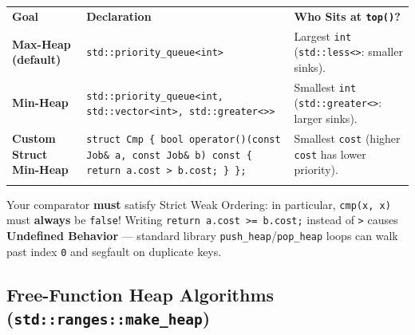 \documentclass[11pt,a4paper]{article}
\theoremstyle{definition}
\begin{document}
\begingroup\small{}
\begin{tabularx}{\textwidth}{>{\raggedright\arraybackslash\bfseries}p{3.9cm} >{\raggedright\arraybackslash}p{4.4cm} >{\raggedright\arraybackslash}X}
\arrayrulecolor{primaryblue}\toprule[1.2pt]
\rowcolor{primaryblue!10}
\textcolor{primaryblue}{\textbf{Goal}} & \textcolor{primaryblue}{\textbf{Declaration}} & \textcolor{primaryblue}{\textbf{Who Sits at \texttt{top()}?}} \\
\arrayrulecolor{codeframe}\midrule[0.6pt]
Max-Heap (default) & \texttt{std::priority\_queue<int>} & Largest \texttt{int} (\texttt{std::less<>}: smaller sinks). \\
Min-Heap & \texttt{std::priority\_queue<int, std::vector<int>, std::greater<>>} & Smallest \texttt{int} (\texttt{std::greater<>}: larger sinks). \\
Custom Struct Min-Heap & \texttt{struct Cmp \{ bool operator()(const Job\& a, const Job\& b) const \{ return a.cost > b.cost; \} \};} & Smallest \texttt{cost} (higher \texttt{cost} has lower priority). \\
\arrayrulecolor{primaryblue}\bottomrule[1.2pt]
\end{tabularx}\endgroup

\begin{watchoutbox}[Watch Out --- Strict Weak Ordering Is Mandatory (Never Use \texttt{<=})]
Your comparator \textbf{must} satisfy Strict Weak Ordering: in particular, \texttt{cmp(x, x)} must \textbf{always} be \texttt{false}! Writing \texttt{return a.cost >= b.cost;} instead of \texttt{>} causes \textbf{Undefined Behavior} --- standard library \texttt{push\_heap}/\texttt{pop\_heap} loops can walk past index \texttt{0} and segfault on duplicate keys.
\end{watchoutbox}

\subsection{Free-Function Heap Algorithms (\texttt{std::ranges::make\_heap})}
\end{document}
